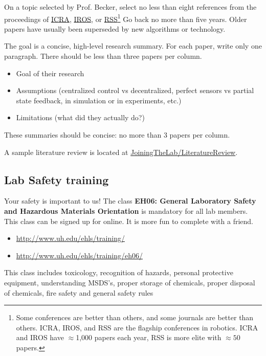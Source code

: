\documentclass[letterpaper, 10 pt, conference]{ieeeconf}
\begin{document}
On a topic selected by Prof. Becker, select no less than eight references from the proceedings of \href{http://ieeexplore.ieee.org/xpl/conhome.jsp?punumber=1000639}{ICRA}, \href{http://ieeexplore.ieee.org/xpl/conhome.jsp?punumber=1000393}{IROS}, or \href{http://www.roboticsconference.org/}{RSS}\footnote{Some conferences are better than others, and some journals are better than others. ICRA, IROS, and RSS are the flagship conferences in robotics.  ICRA and IROS have $\approx$1,000 papers each year, RSS is more elite with $\approx50$ papers.} Go back no more than five years.  Older papers have usually been superseded by new algorithms or technology.

The goal is a concise, high-level research summary.  For each paper, write only one paragraph.  There should be less than three papers per column.

\begin{itemize}
\item Goal of their research 
\item Assumptions (centralized control vs decentralized, perfect sensors vs partial state feedback, in simulation or in experiments, etc.)
\item Limitations (what did they actually do?)
\end{itemize}

These summaries should be concise: no more than 3 papers per column.

A sample literature review is located at \href{
https://github.com/aabecker/RoboticSwarmControlLab/tree/master/JoiningTheLab/LiteratureReview}{JoiningTheLab/LiteratureReview}.

\subsection{Lab Safety training}
Your safety is important to us!
The class \textbf{EH06: General Laboratory Safety and Hazardous Materials Orientation} is mandatory for all lab members. This class can be signed up for online. It is more fun to complete with a friend.

\begin{itemize} 
\item \href{http://www.uh.edu/ehls/training/}{http://www.uh.edu/ehls/training/}
\item \href{http://www.uh.edu/ehls/training/eh06/}{http://www.uh.edu/ehls/training/eh06/}
 \end{itemize}

 
 This class includes toxicology, recognition of hazards, personal protective equipment, understanding MSDS's, proper storage of chemicals, proper disposal of chemicals, fire safety and general safety rules
\end{document}
